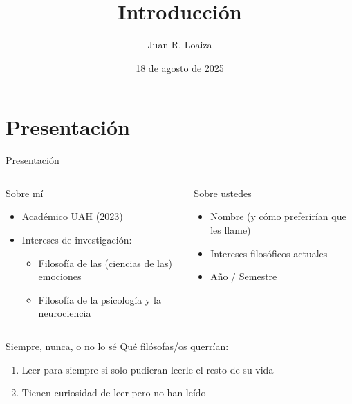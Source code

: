 \documentclass[%
            9pt,
                spanish, %
                    ignorenonframetext,
                    handout, %
                aspectratio=169, %
        ]{beamer}
\title{Introducción}
\author{Juan R. Loaiza}
\date{18 de agosto de 2025}
\institute{Departamento de Filosofía · Universidad Alberto Hurtado}
\providecommand{\tightlist}{}
\begin{document}

\frame{\titlepage}









\section{Presentación}\label{presentaciuxf3n}

\begin{frame}{Presentación}
\begin{columns}[T,onlytextwidth]
\begin{column}{0.48\linewidth}
\begin{block}{Sobre mí}
\protect{}\label{sobre-muxed}
\begin{itemize}
\tightlist
\item
  Académico UAH (2023)
\item
  Intereses de investigación:

  \begin{itemize}
  \tightlist
  \item
    Filosofía de las (ciencias de las) emociones
  \item
    Filosofía de la psicología y la neurociencia
  \end{itemize}
\end{itemize}
\end{block}
\end{column}

\begin{column}{0.48\linewidth}
\begin{block}{Sobre ustedes}
\protect{}\label{sobre-ustedes}
\begin{itemize}
\tightlist
\item
  Nombre (y cómo preferirían que les llame)
\item
  Intereses filosóficos actuales
\item
  Año / Semestre
\end{itemize}
\end{block}
\end{column}
\end{columns}

\begin{block}{Siempre, nunca, o no lo sé}
\protect{}\label{siempre-nunca-o-no-lo-suxe9}
Qué filósofas/os querrían:

\begin{enumerate}
\tightlist
\item
  Leer para siempre si solo pudieran leerle el resto de su vida
\item
  Tienen curiosidad de leer pero no han leído
\end{enumerate}
\end{block}
\end{frame}
\end{document}
